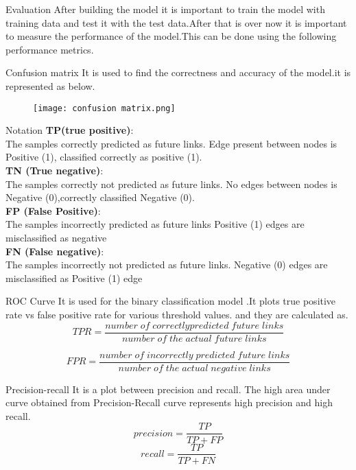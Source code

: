 \documentclass{beamer}
\begin{document}
\begin{frame}{Evaluation}
After building the model it is important to train the model with training data and test it with the test data.After that is over now it is important to measure the performance of the model.This can be done using the following performance metrics.
\begin{block}{Confusion matrix}
It is used to find the correctness and accuracy of the model.it is represented as below.\\
\begin{figure}[ht]
    \centering
    \texttt{[image: confusion matrix.png]}
\end{figure}
\end{block}
\end{frame}
\begin{frame}
\begin{block}{Notation}
\textbf{TP(true positive)}:\\The samples correctly predicted as future links. Edge present between nodes is Positive (1),
classified correctly as positive (1).\\
\textbf{TN (True negative)}:\\ The samples correctly not predicted as future links. No edges between nodes is Negative
(0),correctly classified Negative (0).\\
\textbf{FP (False Positive)}:\\ The samples
incorrectly predicted as future links
Positive (1) edges are misclassified as
negative\\
\textbf{FN (False negative)}:\\ The samples incorrectly not predicted as future links. Negative (0) edges are misclassified as Positive (1) edge

\end{block}
\end{frame}
\begin{frame}
\begin{block}{ROC Curve}
It is used for the binary classification model .It plots true positive rate vs false positive rate for various threshold values.
and they are calculated as.
$$TPR = \frac{number\;of\;correctly predicted \;future \;links}{number\; of \;the\; actual\;future \;links}$$

$$FPR = \frac{number\;of\;incorrectly\; predicted \;future \;links}{number\;of \;the \;actual\; negative\; links}$$
\end{block}
\begin{block}{Precision-recall}
It is a plot between precision and recall. The high area under curve obtained from Precision-Recall curve represents high precision and high recall.
$$precision=\frac{TP}{TP+FP}$$
$$recall=\frac{TP}{TP+FN}$$
\end{block}
    
\end{frame}
\end{document}
